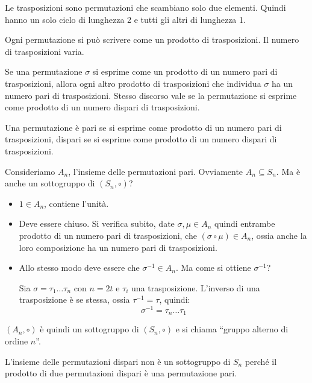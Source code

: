 Le trasposizioni sono permutazioni che scambiano solo due elementi. Quindi hanno un solo ciclo di lunghezza 2 e tutti gli altri di lunghezza 1.
\begin{theorem}
Ogni permutazione si pu\`o scrivere come un prodotto di trasposizioni. Il numero di trasposizioni varia.
\end{theorem}
Se una permutazione $\sigma$ si esprime come un prodotto di un numero pari di trasposizioni, allora ogni altro prodotto di trasposizioni che individua $\sigma$ ha un numero pari di trasposizioni. Stesso discorso vale se la permutazione si esprime come prodotto di un numero dispari di trasposizioni.
\begin{defn}
Una permutazione \`e pari se si esprime come prodotto di un numero pari di trasposizioni, dispari se si esprime come prodotto di un numero dispari di trasposizioni.
\end{defn}
Consideriamo $A_n$, l'insieme delle permutazioni pari. Ovviamente $A_n \subseteq S_n$. Ma \`e anche un sottogruppo di $(S_n, \circ)$?
\begin{itemize}
    \item $1 \in A_n$, contiene l'unit\`a.
    \item Deve essere chiuso. Si verifica subito, date $\sigma, \mu \in A_n $ quindi entrambe prodotto di un numero pari di trasposizioni, che $ (\sigma \circ \mu) \in A_n$, ossia anche la loro composizione ha un numero pari di trasposizioni.
    \item Allo stesso modo deve essere che $\sigma^{-1} \in A_n$. Ma come si ottiene $\sigma^{-1}$?

    Sia $\sigma = \tau_{1} \dots \tau_{n}$ con $n = 2t$ e $\tau_i$ una trasposizione. L'inverso di una trasposizione \`e se stessa, ossia $\tau^{-1} = \tau$, quindi:
    \[
    \sigma^{-1} = \tau_n \dots \tau_1
    \]
\end{itemize}
$(A_n, \circ)$ \`e quindi un sottogruppo di $(S_n, \circ)$ e si chiama \label{gruppo_alterno}``gruppo alterno di ordine $n$''.

L'insieme delle permutazioni dispari non \`e un sottogruppo di $S_n$ perch\'e il prodotto di due permutazioni dispari \`e una permutazione pari.


